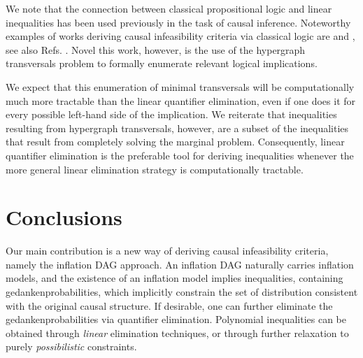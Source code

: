 We note that the connection between classical propositional logic and linear inequalities has been used previously in the task of causal inference. Noteworthy examples of works deriving causal infeasibility criteria via classical logic are \citet{Pitowsky1989} and \citet{Ghirardi08}, see also Refs. \cite{pitowsky_boole_1994,kellerer_marginal_1964,leggett_garg_1985,araujo_cycle_2013}. Novel this work, however, is the use of the hypergraph transversals problem to formally enumerate relevant logical implications. 

We expect that this enumeration of minimal transversals will be computationally much more tractable than the linear quantifier elimination, even if one does it for every possible left-hand side of the implication. We reiterate that inequalities resulting from hypergraph transversals, however, are a subset of the inequalities that result from completely solving the marginal problem. Consequently, linear quantifier elimination is the preferable tool for deriving inequalities whenever the more general linear elimination strategy is computationally tractable. %







\section{Conclusions}

Our main contribution is a new way of deriving causal infeasibility criteria, namely the inflation DAG approach. An inflation DAG naturally carries inflation models, and the existence of an inflation model implies inequalities, containing gedankenprobabilities, which implicitly constrain the set of distribution consistent with the original causal structure. If desirable, one can further eliminate the gedankenprobabilities via quantifier elimination. Polynomial inequalities can be obtained through \emph{linear} elimination techniques, or through further relaxation to purely \emph{possibilistic} constraints.

